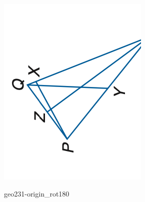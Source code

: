 \documentclass[12pt]{article}
\begin{document}
\begin{center}
\begin{minipage}{0.32\textwidth}
\includegraphics[width=0.95\linewidth]{out_rommath_origin/items/geo231-origin/assets/figure_rot90.png}
\end{minipage}
\par\medskip
\begin{minipage}{0.32\textwidth}\centering
geo231-origin\_rot180\\

\end{minipage}
\end{center}
\end{document}
